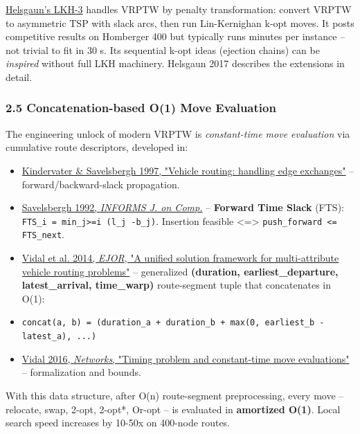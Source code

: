 \documentclass[twocolumn,10pt,letterpaper]{article}
\begin{document}
\href{http://akira.ruc.dk/\textasciitilde{}keld/research/LKH-3/}{Helsgaun's LKH-3} handles VRPTW by penalty transformation: convert VRPTW to asymmetric TSP with slack arcs, then run Lin-Kernighan k-opt moves. It posts competitive results on Homberger 400 but typically runs minutes per instance -- not trivial to fit in 30 s. Its sequential k-opt ideas (ejection chains) can be \textit{inspired} without full LKH machinery. Helsgaun 2017 describes the extensions in detail.


\subsubsection{2.5 Concatenation-based O(1) Move Evaluation}

The engineering unlock of modern VRPTW is \textit{constant-time move evaluation} via cumulative route descriptors, developed in:


\begin{itemize}
\setlength{\itemsep}{0pt}
\setlength{\parskip}{0pt}
  \item \href{https://www.sciencedirect.com/science/article/abs/pii/S0167637795003240}{Kindervater \& Savelsbergh 1997, "Vehicle routing: handling edge exchanges"} -- forward/backward-slack propagation.
  \item \href{https://pubsonline.informs.org/doi/10.1287/ijoc.4.2.146}{Savelsbergh 1992, \textit{INFORMS J. on Comp.}} -- \textbf{Forward Time Slack} (FTS): \texttt{FTS\_i = min\_{j>=i} (l\_j -\allowbreak  b\_j)}. Insertion feasible <=> \texttt{push\_forward <= FTS\_next}.
  \item \href{https://www.sciencedirect.com/science/article/abs/pii/S0377221713005547}{Vidal et al. 2014, \textit{EJOR}, "A unified solution framework for multi-attribute vehicle routing problems"} -- generalized \textbf{(duration, earliest\_departure, latest\_arrival, time\_warp)} route-segment tuple that concatenates in O(1):
  \item \texttt{concat(a, b) = (duration\_a + duration\_b + max(0, earliest\_b -\allowbreak  latest\_a), ...)}
  \item \href{https://doi.org/10.1002/net.21693}{Vidal 2016, \textit{Networks}, "Timing problem and constant-time move evaluations"} -- formalization and bounds.
\end{itemize}

With this data structure, after O(n) route-segment preprocessing, every move -- relocate, swap, 2-opt, 2-opt*, Or-opt -- is evaluated in \textbf{amortized O(1)}. Local search speed increases by 10-50x on 400-node routes.
\end{document}
